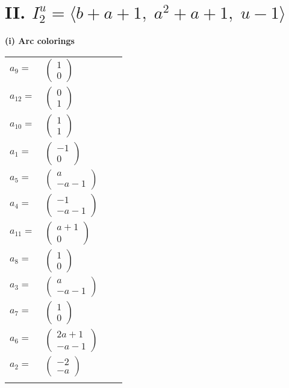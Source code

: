 \documentclass[1p]{elsarticle_modified}
\theoremstyle{definition}
\begin{document}
\centering \section*{II. $I^u_{2}= \langle b+a+1,\;a^2+a+1,\;u-1 \rangle$}
\flushleft \textbf{(i) Arc colorings}\\
\begin{tabular}{m{7pt} m{180pt} m{7pt} m{180pt} }
\flushright $a_{9}=$&$\begin{pmatrix}1\\0\end{pmatrix}$ \\
\flushright $a_{12}=$&$\begin{pmatrix}0\\1\end{pmatrix}$ \\
\flushright $a_{10}=$&$\begin{pmatrix}1\\1\end{pmatrix}$ \\
\flushright $a_{1}=$&$\begin{pmatrix}-1\\0\end{pmatrix}$ \\
\flushright $a_{5}=$&$\begin{pmatrix}a\\- a-1\end{pmatrix}$ \\
\flushright $a_{4}=$&$\begin{pmatrix}-1\\- a-1\end{pmatrix}$ \\
\flushright $a_{11}=$&$\begin{pmatrix}a+1\\0\end{pmatrix}$ \\
\flushright $a_{8}=$&$\begin{pmatrix}1\\0\end{pmatrix}$ \\
\flushright $a_{3}=$&$\begin{pmatrix}a\\- a-1\end{pmatrix}$ \\
\flushright $a_{7}=$&$\begin{pmatrix}1\\0\end{pmatrix}$ \\
\flushright $a_{6}=$&$\begin{pmatrix}2 a+1\\- a-1\end{pmatrix}$ \\
\flushright $a_{2}=$&$\begin{pmatrix}-2\\- a\end{pmatrix}$\\&\end{tabular}
\end{document}
